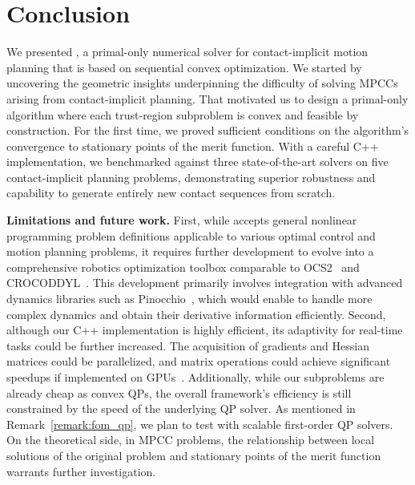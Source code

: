 \section{Conclusion}
\label{sec:conclusion}

We presented \crisp, a primal-only numerical solver for contact-implicit motion planning that is based on sequential convex optimization. We started by uncovering the geometric insights underpinning the difficulty of solving MPCCs arising from contact-implicit planning. That motivated us to design a primal-only algorithm where each trust-region subproblem is convex and feasible by construction. For the first time, we proved sufficient conditions on the algorithm's convergence to stationary points of the merit function. With a careful C++ implementation, we benchmarked \crisp against three state-of-the-art solvers on five contact-implicit planning problems, demonstrating superior robustness and capability to generate entirely new contact sequences from scratch.

\textbf{Limitations and future work. }
First, while \crisp accepts general nonlinear programming problem definitions applicable to various optimal control and motion planning problems, it requires further development to evolve into a comprehensive robotics optimization toolbox comparable to OCS2~\cite{OCS2} and CROCODDYL~\cite{mastalli20crocoddyl}. This development primarily involves integration with advanced dynamics libraries such as Pinocchio~\cite{carpentier2019pinocchio}, which would enable \crisp to handle more complex dynamics and obtain their derivative information efficiently. 
Second, although our C++ implementation is highly efficient, its adaptivity for real-time tasks could be further increased. The acquisition of gradients and Hessian matrices could be parallelized, and matrix operations could achieve significant speedups if implemented on GPUs~\cite{kang2024arxiv-strom}. Additionally, while our subproblems are already cheap as convex QPs, the overall framework's efficiency is still constrained by the speed of the underlying QP solver. As mentioned in Remark~\ref{remark:fom_qp}, we plan to test \crisp with scalable first-order QP solvers. On the theoretical side, 
in MPCC problems, the relationship between local solutions of the original problem and stationary points of the merit function warrants further investigation.

